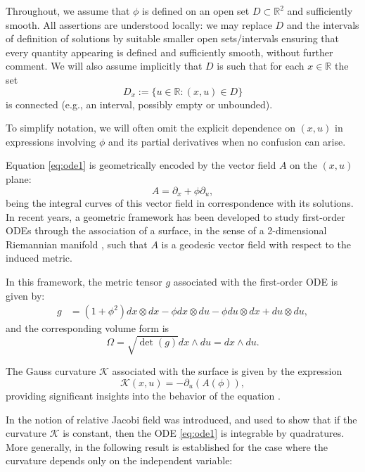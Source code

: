 \documentclass[preprint,a4paper]{elsarticle}
\begin{document}
Throughout, we assume that $\phi$ is defined on an open set $D\subset\mathbb{R}^2$ and sufficiently smooth. All assertions are understood locally: we may replace $D$ and the intervals of definition of solutions by suitable smaller open sets/intervals ensuring that every quantity appearing is defined and sufficiently smooth, without further comment. We will also assume implicitly that $D$ is such that for each $x\in \mathbb R$ the set
\[
D_x:=\{u\in\mathbb{R}:(x,u)\in D\}
\]
is connected (e.g., an interval, possibly empty or unbounded).

To simplify notation, we will often omit the explicit dependence on $(x,u)$ in expressions involving $\phi$ and its partial derivatives when no confusion can arise.



Equation \eqref{eq:ode1} is geometrically encoded by the vector field $A$ on the $(x,u)$ plane:
\begin{equation} \label{eq:vector_field}
    A = \partial_x + \phi\partial_u,
\end{equation}
being the integral curves of this vector field in correspondence with its solutions. In recent years, a geometric framework has been developed to study first-order ODEs through the association of a surface, in the sense of a 2-dimensional Riemannian manifold \cite{Bayrakdar2018a,integrationJacobifields,surfaces2025}, such that $A$ is a geodesic vector field with respect to the induced metric.

In this framework, the metric tensor $g$ associated with the first-order ODE is given by:
\begin{align}\label{metricBay}
    g&=( 1+ \phi^2)dx\otimes dx-\phi dx\otimes du-\phi du\otimes dx+du\otimes du,
\end{align}
and the corresponding volume form is
\begin{equation}\label{volume_form}
    \Omega = \sqrt{\det(g)} dx \wedge du = dx \wedge du.
\end{equation}


The Gauss curvature $\mathcal K$ associated with the surface is given by the expression
\begin{equation} \label{eq:curvature_formula}
    \mathcal{K}(x,u) = -\partial_u(A(\phi)),
\end{equation}
providing significant insights into the behavior of the equation \cite{Bayrakdar2018a,surfaces2025,integrationJacobifields}.


In \cite{surfaces2025,integrationJacobifields} the notion of relative Jacobi field was introduced, and used to show that if the curvature $\mathcal{K}$ is constant, then the ODE \eqref{eq:ode1} is integrable by quadratures. More generally, in \cite{integrationJacobifields} the following result is established for the case where the curvature depends only on the independent variable:
\end{document}
